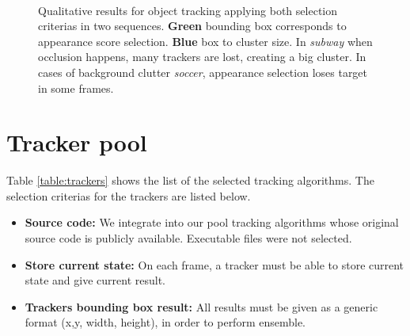 \begin{figure}[t!]
\centering
	 \\
	\hspace{0.05cm}
\vspace{-2mm}
\caption{\small Qualitative results for object tracking applying both selection
	criterias in two sequences. \textbf{Green} bounding box corresponds to
	appearance score selection. \textbf{Blue} box to cluster size. In
	\textit{subway} when occlusion happens, many trackers are lost, creating a
	big cluster. In cases of background clutter \textit{soccer}, appearance
	selection loses target in some frames.}
\label{fig::clustvsapp}
\end{figure}


\section{Tracker pool}

Table \ref{table:trackers} shows the list of the
selected tracking algorithms. The selection criterias for the trackers are
listed below.
\begin{itemize}
\item \textbf{Source code: } We integrate into our pool tracking algorithms
whose original source code is publicly available. Executable files were not
selected.
\item \textbf{Store current state: } On each frame, a tracker must be able to
store current state and give current result.
\item \textbf{Trackers bounding box result: } All results must be given as
a generic format (x,y, width, height), in order to perform ensemble.
\end{itemize}


